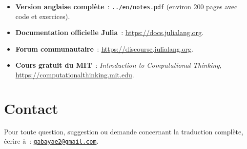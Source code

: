 \documentclass[12pt,a4paper]{article}
\begin{document}
\begin{itemize}[leftmargin=1.5em]
  \item \textbf{Version anglaise complète}~: \texttt{../en/notes.pdf} (environ 200 pages avec code et exercices).
  \item \textbf{Documentation officielle Julia}~: \url{https://docs.julialang.org}.
  \item \textbf{Forum communautaire}~: \url{https://discourse.julialang.org}.
  \item \textbf{Cours gratuit du MIT}~: \emph{Introduction to Computational Thinking}, \url{https://computationalthinking.mit.edu}.
\end{itemize}

\section*{Contact}

Pour toute question, suggestion ou demande concernant la traduction complète, écrire à~: \href{mailto:gabayae2@gmail.com}{\texttt{gabayae2@gmail.com}}.
\end{document}
